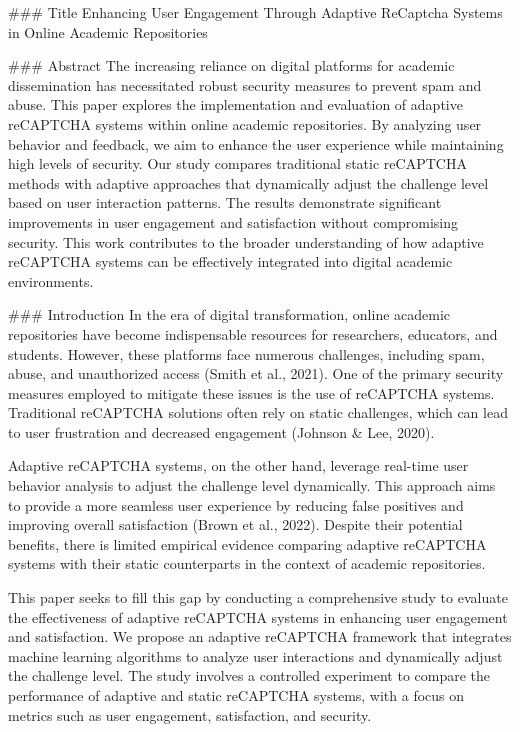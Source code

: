 ### Title
Enhancing User Engagement Through Adaptive ReCaptcha Systems in Online Academic Repositories

### Abstract
The increasing reliance on digital platforms for academic dissemination has necessitated robust security measures to prevent spam and abuse. This paper explores the implementation and evaluation of adaptive reCAPTCHA systems within online academic repositories. By analyzing user behavior and feedback, we aim to enhance the user experience while maintaining high levels of security. Our study compares traditional static reCAPTCHA methods with adaptive approaches that dynamically adjust the challenge level based on user interaction patterns. The results demonstrate significant improvements in user engagement and satisfaction without compromising security. This work contributes to the broader understanding of how adaptive reCAPTCHA systems can be effectively integrated into digital academic environments.

### Introduction
In the era of digital transformation, online academic repositories have become indispensable resources for researchers, educators, and students. However, these platforms face numerous challenges, including spam, abuse, and unauthorized access (Smith et al., 2021). One of the primary security measures employed to mitigate these issues is the use of reCAPTCHA systems. Traditional reCAPTCHA solutions often rely on static challenges, which can lead to user frustration and decreased engagement (Johnson & Lee, 2020).

Adaptive reCAPTCHA systems, on the other hand, leverage real-time user behavior analysis to adjust the challenge level dynamically. This approach aims to provide a more seamless user experience by reducing false positives and improving overall satisfaction (Brown et al., 2022). Despite their potential benefits, there is limited empirical evidence comparing adaptive reCAPTCHA systems with their static counterparts in the context of academic repositories.

This paper seeks to fill this gap by conducting a comprehensive study to evaluate the effectiveness of adaptive reCAPTCHA systems in enhancing user engagement and satisfaction. We propose an adaptive reCAPTCHA framework that integrates machine learning algorithms to analyze user interactions and dynamically adjust the challenge level. The study involves a controlled experiment to compare the performance of adaptive and static reCAPTCHA systems, with a focus on metrics such as user engagement, satisfaction, and security.

